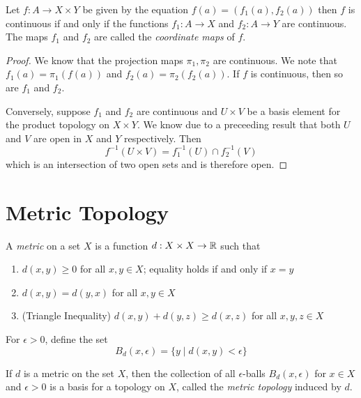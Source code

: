 \begin{theorem}
    Let $f:A\to X\times Y$ be given by the equation $f(a) = (f_1(a), f_2(a))$ then $f$ is continuous if and only if the functions $f_1:A\to X$ and $f_2:A\to Y$ are continuous. The maps $f_1$ and $f_2$ are called the \textit{coordinate maps} of $f$.
\end{theorem}
\begin{proof}
    We know that the projection maps $\pi_1, \pi_2$ are continuous. We note that $f_1(a) = \pi_1(f(a))$ and $f_2(a) = \pi_2(f_2(a))$. If $f$ is continuous, then so are $f_1$ and $f_2$.

    Conversely, suppose $f_1$ and $f_2$ are continuous and $U\times V$ be a basis element for the product topology on $X\times Y$. We know due to a preceeding result that both $U$ and $V$ are open in $X$ and $Y$ respectively. Then 
    \begin{equation*}
        f^{-1}(U\times V) = f_1^{-1}(U)\cap f_2^{-1}(V)
    \end{equation*}
    which is an intersection of two open sets and is therefore open.
\end{proof}

\section{Metric Topology}
\begin{definition}[Metric]
    A \textit{metric} on a set $X$ is a function $d:X\times X\to\mathbb{R}$ such that 
    \begin{enumerate}
        \item $d(x,y)\ge0$ for all $x,y\in X$; equality holds if and only if $x = y$
        \item $d(x, y) = d(y, x)$ for all $x,y\in X$ 
        \item (Triangle Inequality) $d(x, y) + d(y, z)\ge d(x, z)$ for all $x,y,z\in X$
    \end{enumerate}
\end{definition}

For $\epsilon > 0$, define the set 
\begin{equation*}
    B_d(x,\epsilon) = \{y\mid d(x,y) < \epsilon\}
\end{equation*}

\begin{definition}
    If $d$ is a metric on the set $X$, then the collection of all $\epsilon$-balls $B_d(x,\epsilon)$ for $x\in X$ and $\epsilon > 0$ is a basis for a topology on $X$, called the \textit{metric topology} induced by $d$.
\end{definition}

